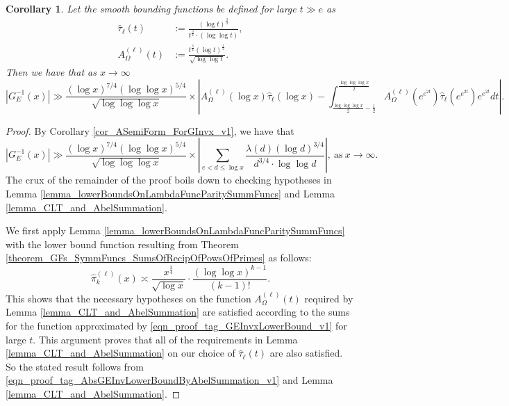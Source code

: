 \documentclass[11pt,reqno,a4letter]{article}
\numberwithin{figure}{section}
\numberwithin{table}{section}
\theoremstyle{plain}
\newtheorem{cor}[theorem]{Corollary}
\numberwithin{theorem}{section}
\theoremstyle{definition}
\begin{document}
\begin{cor} 
\label{cor_CondsOnCentralBoundingFuncs_v3} 
Let the smooth bounding functions be defined for large $t \gg e$ as 
\begin{align*} 
\widehat{\tau}_{\ell}(t) & := \frac{(\log t)^{\frac{3}{4}}}{t^{\frac{3}{4}} \cdot (\log\log t)},  \\ 
A_{\Omega}^{(\ell)}(t) & := 
     \frac{t^{\frac{3}{4}} (\log t)^{\frac{1}{2}}}{\sqrt{\log\log t}}. 
\end{align*} 
Then we have that as $x \rightarrow \infty$ 
\[
|G_E^{-1}(x)| \gg 
     \frac{(\log x)^{7/4} (\log\log x)^{5/4}}{\sqrt{\log\log\log x}} \times 
     \left\lvert A_{\Omega}^{(\ell)}(\log x) \widehat{\tau}_{\ell}(\log x) - 
     \int_{\frac{\log\log\log x}{2} - \frac{1}{2}}^{\frac{\log\log\log x}{2}} 
     A_{\Omega}^{(\ell)}\left(e^{e^{2t}}\right) 
     \widehat{\tau}_{\ell}\left(e^{e^{2t}}\right) e^{e^{2t}} dt
     \right\rvert. 
\]
\end{cor} 
\begin{proof} 
By Corollary \ref{cor_ASemiForm_ForGInvx_v1}, we have that 
\begin{equation} 
\label{eqn_proof_tag_AbsGEInvLowerBoundByAbelSummation_v1} 
|G_E^{-1}(x)| \gg 
     \frac{(\log x)^{7/4} (\log\log x)^{5/4}}{\sqrt{\log\log\log x}} \times 
     \left\lvert \sum_{e < d \leq \log x} \frac{\lambda(d) (\log d)^{3/4}}{ 
     d^{3/4} \cdot \log\log d} \right\rvert, 
     \mathrm{\ as\ } x \rightarrow \infty.  
\end{equation} 
The crux of the remainder of the proof boils down to checking hypotheses in 
Lemma \ref{lemma_lowerBoundsOnLambdaFuncParitySummFuncs} and 
Lemma \ref{lemma_CLT_and_AbelSummation}. 

We first apply Lemma \ref{lemma_lowerBoundsOnLambdaFuncParitySummFuncs} with 
the lower bound function resulting from 
Theorem \ref{theorem_GFs_SymmFuncs_SumsOfRecipOfPowsOfPrimes} as follows: 
\[
\widehat{\pi}_k^{(\ell)}(x) \asymp  
     \frac{x^{\frac{3}{4}}}{\sqrt{\log x}} \cdot 
     \frac{(\log\log x)^{k-1}}{(k-1)!}. 
\] 
This shows that the necessary hypotheses on the function 
$A_{\Omega}^{(\ell)}(t)$ required by 
Lemma \ref{lemma_CLT_and_AbelSummation} 
are satisfied according to the sums for the function 
approximated by \eqref{eqn_proof_tag_GEInvxLowerBound_v1} for large $t$. 
This argument proves that all of the requirements in 
Lemma \ref{lemma_CLT_and_AbelSummation} 
on our choice of $\widehat{\tau}_{\ell}(t)$ are also satisfied. 
So the stated result follows from 
\eqref{eqn_proof_tag_AbsGEInvLowerBoundByAbelSummation_v1} and 
Lemma \ref{lemma_CLT_and_AbelSummation}. 
\end{proof} 
\end{document}
